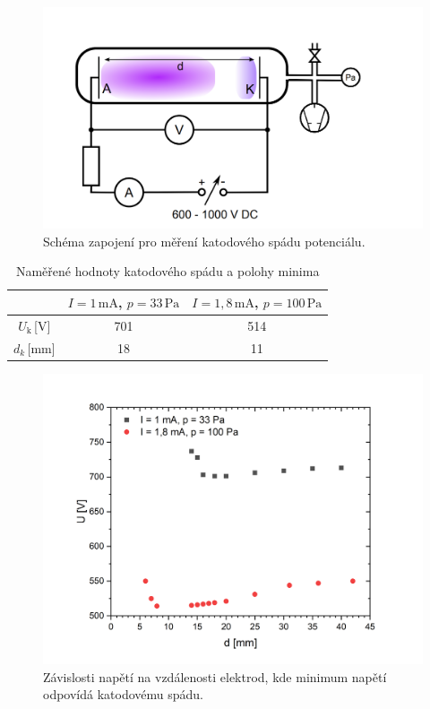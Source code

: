 \documentclass[a4paper,12pt]{article}
\begin{document}
	  


\begin{figure}[h!]
	\centering
	\includegraphics[width=145mm]{schema2v2.png}
	\caption{Schéma zapojení pro měření katodového spádu potenciálu.}
	\label{schema2v2}
\end{figure}

\begin{center}
	\begin{table}[h!]
		\centering
		\caption{Naměřené hodnoty katodového spádu a polohy minima}
		\label{tab2}
		\begin{tabular}{|c|c|c|} \hline
			& $I = 1\,\si{\milli\ampere}$, $p = 33\,\si{\pascal}$ 
			& $I = 1,8\,\si{\milli\ampere}$, $p = 100\,\si{\pascal}$\\ \hline
			$U_\text{k}$\,[V] & 701 & 514 \\ \hline
			$d_k$\,[mm] & 18 & 11 \\ \hline
			
		\end{tabular}
	\end{table}
\end{center}

\begin{figure}[h!]
	\centering
	\includegraphics[width=145mm]{KatodovySpad.png}
	\caption{Závislosti napětí na vzdálenosti elektrod, kde minimum napětí odpovídá katodovému spádu.}
	\label{KatodovySpad}
\end{figure}
\end{document}
